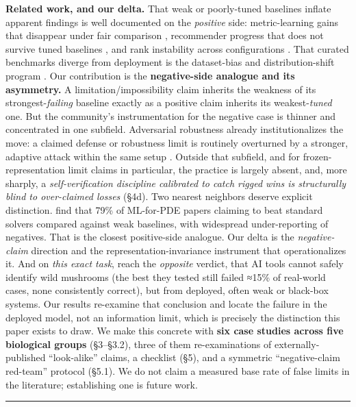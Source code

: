 \textbf{Related work, and our delta.} That weak or poorly-tuned
baselines inflate apparent findings is well documented on the
\emph{positive} side: metric-learning gains that disappear under fair
comparison \citep{musgrave2020}, recommender progress that does not
survive tuned baselines \citep{dacrema2019}, and rank instability across
configurations \citep{dehghani2021, bouthillier2021}. That curated
benchmarks diverge from deployment is the dataset-bias and
distribution-shift program \citep{torralba2011, koh2021, hendrycks2021}.
Our contribution is the \textbf{negative-side analogue and its
asymmetry.} A limitation/impossibility claim inherits the weakness of
its strongest-\emph{failing} baseline exactly as a positive claim
inherits its weakest-\emph{tuned} one. But the community's
instrumentation for the negative case is thinner and concentrated in one
subfield. Adversarial robustness already institutionalizes the move: a
claimed defense or robustness limit is routinely overturned by a
stronger, adaptive attack within the same setup
\citep{athalye2018, tramer2020}. Outside that subfield, and for
frozen-representation limit claims in particular, the practice is
largely absent, and, more sharply, a \emph{self-verification discipline
calibrated to catch rigged wins is structurally blind to over-claimed
losses} (§4d). Two nearest neighbors deserve explicit distinction.
\citet{mcgreivy2024} find that 79\% of ML-for-PDE papers claiming to
beat standard solvers compared against weak baselines, with widespread
under-reporting of negatives. That is the closest positive-side
analogue. Our delta is the \emph{negative-claim} direction and the
representation-invariance instrument that operationalizes it. And on
\emph{this exact task}, \citet{kuznetsov2026} reach the \emph{opposite}
verdict, that AI tools cannot safely identify wild mushrooms (the best
they tested still failed ≈15\% of real-world cases, none consistently
correct), but from deployed, often weak or black-box systems. Our
results re-examine that conclusion and locate the failure in the
deployed model, not an information limit, which is precisely the
distinction this paper exists to draw. We make this concrete with
\textbf{six case studies across five biological groups} (§3--§3.2),
three of them re-examinations of externally-published ``look-alike''
claims, a checklist (§5), and a symmetric ``negative-claim red-team''
protocol (§5.1). We do not claim a measured base rate of false limits in
the literature; establishing one is future work.

\begin{center}\rule{0.5\linewidth}{0.5pt}\end{center}

